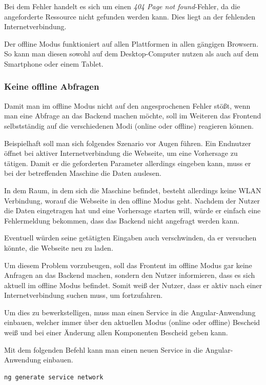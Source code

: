 Bei dem Fehler handelt es sich um einen \textit{404 Page not found}-Fehler, da die angeforderte Ressource nicht gefunden
werden kann. Dies liegt an der fehlenden Internetverbindung.

Der offline Modus funktioniert auf allen Plattformen in allen gängigen Browsern. So kann man diesen sowohl auf dem
Desktop-Computer nutzen als auch auf dem Smartphone oder einem Tablet.

\subsubsection{Keine offline Abfragen}
Damit man im offline Modus nicht auf den angesprochenen Fehler stößt, wenn man eine Abfrage an das Backend machen
möchte, soll im Weiteren das Frontend selbstständig auf die verschiedenen Modi (online oder offline) reagieren können.

Beispielhaft soll man sich folgendes Szenario vor Augen führen. Ein Endnutzer öffnet bei aktiver Internetverbindung die
Webseite, um eine Vorhersage zu tätigen. Damit er die geforderten Parameter allerdings eingeben kann, muss er bei
der betreffenden Maschine die Daten auslesen.

In dem Raum, in dem sich die Maschine befindet, besteht allerdings keine WLAN Verbindung, worauf die Webseite in den
offline Modus geht. Nachdem der Nutzer die Daten eingetragen hat und eine Vorhersage starten will, würde er einfach
eine Fehlermeldung bekommen, dass das Backend nicht angefragt werden kann.

Eventuell würden seine getätigten Eingaben auch verschwinden, da er versuchen könnte, die Webseite neu zu laden.

Um diesem Problem vorzubeugen, soll das Frontent im offline Modus gar keine Anfragen an das Backend machen, sondern den
Nutzer informieren, dass es sich aktuell im offline Modus befindet. Somit weiß der Nutzer, dass er aktiv nach einer
Internetverbindung suchen muss, um fortzufahren.

Um dies zu bewerkstelligen, muss man einen Service in die Angular-Anwendung einbauen, welcher immer über den aktuellen
Modus (online oder offline) Bescheid weiß und bei einer Änderung allen Komponenten Bescheid geben kann.

Mit dem folgenden Befehl kann man einen neuen Service in die Angular-Anwendung einbauen.

\begin{lstlisting}[caption=Hinzufügen eines Services, label=ls:umsetzung_angularaddservice]
    ng generate service network
\end{lstlisting}

